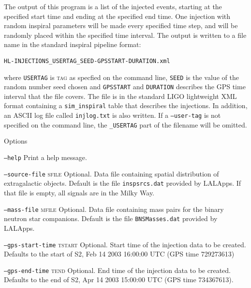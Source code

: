 \begin{entry}
The output of this program  is  a  list  of  the  injected events,  starting
at  the specified start time and ending at the specified end time.  One 
injection with random inspiral parameters will be made every specified time
step, and will be randomly placed within the specified time interval.  
The output is written to a file name in the standard inspiral pipeline format:
\begin{center}
\begin{verbatim}
HL-INJECTIONS_USERTAG_SEED-GPSSTART-DURATION.xml
\end{verbatim}
\end{center}
where \verb$USERTAG$ is \textsc{tag} as specfied on the command line, 
\verb$SEED$ is the  value  of  the random number seed chosen and 
\verb$GPSSTART$ and \verb$DURATION$ describes the GPS time interval that
the file covers. The file is in the standard LIGO lightweight XML format
containing a \texttt{sim\_inspiral} table that describes the injections.
In addition, an ASCII log file called \verb$injlog.txt$ is also written.
If a \texttt{--user-tag} is not specified on the command line, the
\texttt{\_USERTAG} part of the filename will be omitted.

\item[Options]\leavevmode
\begin{entry}
\item[\texttt{--help}] Print a help message.

\item[\texttt{--source-file} \textsc{sfile}]
Optional. Data file containing spatial distribution of  extragalactic  objects.
Default  is  the file \verb+inspsrcs.dat+ provided by LALApps. If that file is 
empty, all signals are in the Milky Way.

\item[\texttt{--mass-file} \textsc{mfile}]
Optional. Data file containing mass pairs  for  the binary  neutron  star
companions.   Default is the file \verb+BNSMasses.dat+ provided by LALApps.

\item[\texttt{--gps-start-time} \textsc{tstart}]
Optional.  Start time of the injection data to be created. Defaults to the
start of S2, Feb 14 2003 16:00:00 UTC (GPS time 729273613)

\item[\texttt{--gps-end-time} \textsc{tend}]
Optional. End time of the injection data to be created. Defaults to the end of
S2, Apr 14 2003 15:00:00 UTC (GPS time 734367613).


\end{entry}
\end{entry}
